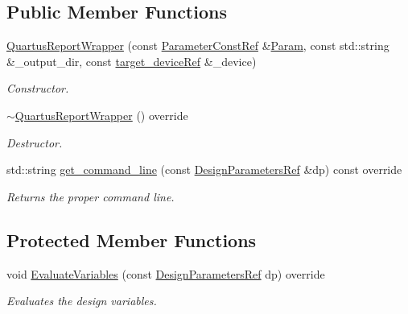 \subsection*{Public Member Functions}
\begin{DoxyCompactItemize}
\item 
\hyperlink{classQuartusReportWrapper_a9a9043401bdb33ab3f80648479fa603d}{Quartus\+Report\+Wrapper} (const \hyperlink{Parameter_8hpp_a37841774a6fcb479b597fdf8955eb4ea}{Parameter\+Const\+Ref} \&\hyperlink{classSynthesisTool_a854ef102782ff4d069e1aa6d1a94d64e}{Param}, const std\+::string \&\+\_\+output\+\_\+dir, const \hyperlink{target__device_8hpp_acedb2b7a617e27e6354a8049fee44eda}{target\+\_\+device\+Ref} \&\+\_\+device)
\begin{DoxyCompactList}\small\item\em Constructor. \end{DoxyCompactList}\item 
\hyperlink{classQuartusReportWrapper_a4a82080cddea0ca98b86c9c119c37fbc}{$\sim$\+Quartus\+Report\+Wrapper} () override
\begin{DoxyCompactList}\small\item\em Destructor. \end{DoxyCompactList}\item 
std\+::string \hyperlink{classQuartusReportWrapper_a1f864436a60dc37ac6cdaa03c720a0a6}{get\+\_\+command\+\_\+line} (const \hyperlink{DesignParameters_8hpp_ae36bb1c4c9150d0eeecfe1f96f42d157}{Design\+Parameters\+Ref} \&dp) const override
\begin{DoxyCompactList}\small\item\em Returns the proper command line. \end{DoxyCompactList}\end{DoxyCompactItemize}
\subsection*{Protected Member Functions}
\begin{DoxyCompactItemize}
\item 
void \hyperlink{classQuartusReportWrapper_a71622a41d39325f2595a06f60415016c}{Evaluate\+Variables} (const \hyperlink{DesignParameters_8hpp_ae36bb1c4c9150d0eeecfe1f96f42d157}{Design\+Parameters\+Ref} dp) override
\begin{DoxyCompactList}\small\item\em Evaluates the design variables. \end{DoxyCompactList}\end{DoxyCompactItemize}

